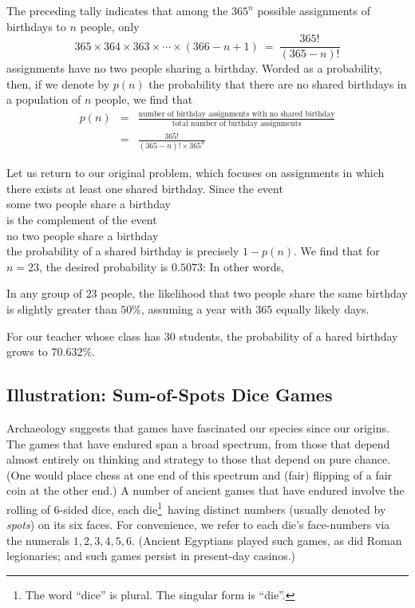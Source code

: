 The preceding tally indicates that among the $365^n$ possible
assignments of birthdays to $n$ people, only
\[ 365 \times 364 \times 363 \times \cdots \times
(366-n+1) \ = \ \frac{365!}{(365-n)!} 
\]
assignments have no two people sharing a birthday.  Worded as a
probability, then, if we denote by $p(n)$ the probability that there are no shared
birthdays in a population of $n$ people, we find that
\begin{eqnarray*}
p(n) & = &
\frac{\mbox{number of birthday assignments with no shared birthday}}
{\mbox{total number of birthday assignments}} \\
 &  = & \frac{365!}{ (365-n)!  \times 365^n}
\end{eqnarray*}

\medskip

Let us return to our original problem, which focuses on assignments in
which there exists at least one shared birthday.  Since the event \\
\hspace*{.25in}some two people share a birthday \\
is the complement of the event \\
\hspace*{.25in}no two people share a birthday \\
the probability of a shared birthday is precisely $1-p(n)$.  We find
that for $n=23$, the desired probability is $0.5073$:  In other words,

\begin{prop}
In any group of $23$ people, the likelihood that two people share the same
birthday is slightly greater than $50\%$, assuming a year with $365$
equally likely days.
\end{prop}

For our teacher whose class has 30 students, the probability of a hared birthday grows
to $70.632\%$.


\subsection{Illustration: Sum-of-Spots Dice Games}
\label{sec:three-dice}

Archaeology suggests that games have fascinated our species since our
origins.  The games that have endured span a broad spectrum, from
those that depend almost entirely on thinking and strategy to those
that depend on pure chance.  (One would place chess at one end of this
spectrum and (fair) flipping of a fair coin at the other end.)  A
number of ancient games that have endured involve the rolling of
6-sided dice, each die\footnote{The word ``dice'' is plural.  The
  singular form is ``die''.}~having distinct numbers (usually denoted
by {\it spots}) on its six faces.  For convenience, we refer to each
die's face-numbers via the numerals $1, 2, 3, 4, 5, 6$.  (Ancient
Egyptians played such games, as did Roman legionaries; and such games
persist in present-day casinos.)

